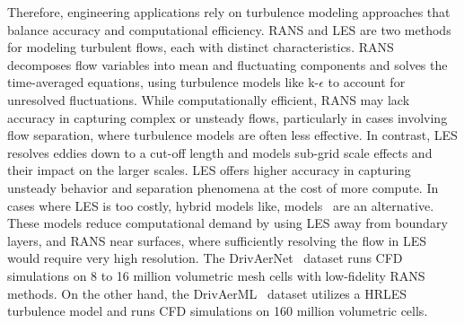  Therefore, engineering applications rely on turbulence modeling approaches that balance accuracy and computational efficiency. 
 \ac{RANS} \cite{reynolds1895iv, alfonsi2009reynolds} and \ac{LES} \cite{lesieur2005large} are two methods for modeling turbulent flows, each with distinct characteristics. 
 \ac{RANS} decomposes flow variables into mean and fluctuating components and solves the time-averaged equations, using turbulence models like k-$\epsilon$ \cite{LAUNDER1974kepsilon} to account for unresolved fluctuations. 
 While computationally efficient, \ac{RANS} may lack accuracy in capturing complex or unsteady flows, particularly in cases involving flow separation, where turbulence models are often less effective.
 In contrast, \ac{LES} resolves eddies down to a cut-off length and models sub-grid scale effects and their impact on the larger scales. 
 \ac{LES} offers higher accuracy in capturing unsteady behavior and separation phenomena at the cost of more compute. 
 In cases where \ac{LES} is too costly, hybrid models like, 
  models~\cite{spalart2006new, chaouat2017state, heinz2020review, ashton2022hlpw} are an alternative. 
 These models reduce computational demand by using \ac{LES} away from boundary layers, and \ac{RANS} near surfaces, where sufficiently resolving the flow in \ac{LES} would require very high resolution.
The DrivAerNet~\cite{elrefaie2024drivaernet, elrefaie2024drivaernet++} dataset runs \ac{CFD} simulations on 8 to 16 million volumetric mesh cells with low-fidelity \ac{RANS} methods.
On the other hand, the DrivAerML~\cite{ashton2024drivaerml} dataset utilizes a \ac{HRLES} turbulence model and runs \ac{CFD} simulations on 160 million volumetric cells. 
 
